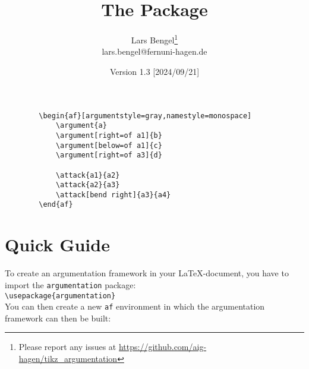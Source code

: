 \documentclass[headings=normal]{scrartcl}
\title{The \argumentation Package}
\author{Lars Bengel\footnote{Please report any issues at \url{https://github.com/aig-hagen/tikz_argumentation}}\\\small lars.bengel@fernuni-hagen.de}
\date{Version 1.3 [2024/09/21]}
\newcommand{\argumentation}{\texttt{argumentation}\xspace}
\begin{document}
\maketitle

\begin{minipage}{.26\textwidth}
    \centering
        \begin{af}[argumentstyle=gray,namestyle=monospace]
    
        \end{af}
\end{minipage}
\begin{minipage}{.5\textwidth}
    \begin{small}
    \begin{verbatim}
        \begin{af}[argumentstyle=gray,namestyle=monospace]
            \argument{a}
            \argument[right=of a1]{b}
            \argument[below=of a1]{c}
            \argument[right=of a3]{d}
    
            \attack{a1}{a2}
            \attack{a2}{a3}
            \attack[bend right]{a3}{a4}
        \end{af}
    \end{verbatim}
    \end{small}
\end{minipage}


\tableofcontents
\newpage

\section{Quick Guide}\label{sec:quick}

\noindent
To create an argumentation framework in your \LaTeX-document, you have to import the \argumentation package:\\

\vspace{-0.3cm}
\verb|\usepackage{argumentation}|\\

\noindent
You can then create a new \texttt{af} environment in which the argumentation framework can then be built:\\
\end{document}
